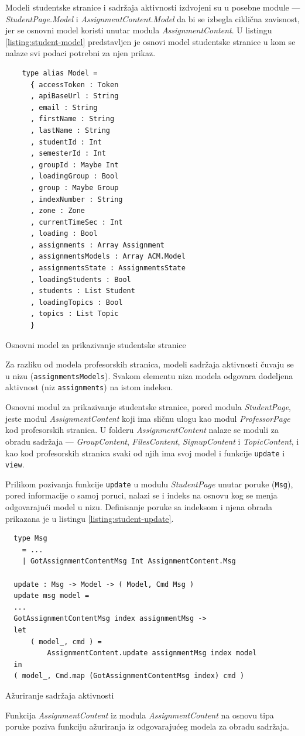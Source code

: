 \documentclass[12pt,oneside]{memoir}
\begin{document}
Modeli studentske stranice i sadržaja aktivnosti izdvojeni su u posebne module --- \emph{StudentPage.Model} i
\emph{AssignmentContent.Model} da bi se izbegla ciklična zavisnost, jer se osnovni model koristi unutar
modula \emph{AssignmentContent}. U listingu \ref{listing:student-model} predstavljen je osnovi model studentske stranice u kom se
nalaze svi podaci potrebni za njen prikaz.
\begin{listing}[h]
\begin{verbatim}
    type alias Model =
      { accessToken : Token
      , apiBaseUrl : String
      , email : String
      , firstName : String
      , lastName : String
      , studentId : Int
      , semesterId : Int
      , groupId : Maybe Int
      , loadingGroup : Bool
      , group : Maybe Group
      , indexNumber : String
      , zone : Zone
      , currentTimeSec : Int
      , loading : Bool
      , assignments : Array Assignment
      , assignmentsModels : Array ACM.Model
      , assignmentsState : AssignmentsState
      , loadingStudents : Bool
      , students : List Student
      , loadingTopics : Bool
      , topics : List Topic
      }
\end{verbatim}
\caption{Osnovni model za prikazivanje studentske stranice}
\label{listing:student-model}
\end{listing}
Za razliku od modela profesorskih stranica, modeli sadržaja aktivnosti čuvaju se u nizu
(\texttt{assignmentsModels}). Svakom elementu niza modela odgovara dodeljena aktivnost (niz \texttt{assignments}) na istom indeksu.

Osnovni modul za prikazivanje studentske stranice, pored modula \emph{StudentPage}, jeste modul
\emph{AssignmentContent} koji ima sličnu ulogu kao modul \emph{ProfessorPage} kod profesorskih
stranica. U folderu \emph{AssignmentContent} nalaze se moduli za obradu sadržaja --- \emph{GroupContent}, \emph{FilesContent},
\emph{SignupContent} i \emph{TopicContent}, i kao kod profesorskih stranica svaki od njih ima svoj
model i funkcije \texttt{update} i \texttt{view}.

Prilikom pozivanja funkcije \texttt{update} u modulu \emph{StudentPage} unutar poruke (\texttt{Msg}), pored informacije o
samoj poruci, nalazi se i indeks na osnovu kog se menja odgovarajući model u nizu. Definisanje poruke sa indeksom i njena
obrada prikazana je u listingu \ref{listing:student-update}.
\begin{listing}[h]
\begin{verbatim}
  type Msg
    = ...
    | GotAssignmentContentMsg Int AssignmentContent.Msg

  update : Msg -> Model -> ( Model, Cmd Msg )
  update msg model =
  ...
  GotAssignmentContentMsg index assignmentMsg ->
  let
      ( model_, cmd ) =
          AssignmentContent.update assignmentMsg index model
  in
  ( model_, Cmd.map (GotAssignmentContentMsg index) cmd )
\end{verbatim}
\caption{Ažuriranje sadržaja aktivnosti}
\label{listing:student-update}
\end{listing}
Funkcija \emph{AssignmentContent} iz modula \emph{AssignmentContent} na osnovu tipa poruke poziva
funkciju ažuriranja iz odgovarajućeg modela za obradu sadržaja.
\end{document}
